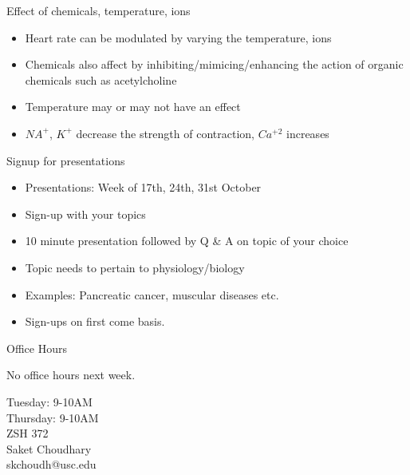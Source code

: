 \documentclass[10pt]{beamer}
\begin{document}
\begin{frame}[fragile]{Effect of chemicals, temperature, ions}
\begin{itemize}
\item Heart rate can be modulated by varying the temperature, ions
\item Chemicals also affect by inhibiting/mimicing/enhancing the action of organic chemicals such as acetylcholine
\item Temperature may or may not have an effect
\item $NA^+$, $K^+$ decrease the strength of contraction, $Ca^{+2}$ increases
\end{itemize}
\end{frame}

\begin{frame}[fragile]{Signup for presentations}
\begin{itemize}
\item Presentations: Week of 17th, 24th, 31st October
\item Sign-up with your topics
\item 10 minute presentation followed by Q \& A on topic of your choice
\item Topic needs to pertain to physiology/biology
\item Examples: Pancreatic cancer, muscular diseases etc.
\item Sign-ups on first come basis.
\end{itemize}
\end{frame}

\begin{frame}[fragile]{Office Hours}
\begin{center}
No office hours next week.
\end{center}

\Large \begin{center}Tuesday: 9-10AM\\
Thursday: 9-10AM\\
ZSH 372\\
\vspace*{2cm}
Saket Choudhary\\ 
skchoudh@usc.edu\\
\end{center}


\end{frame}
\end{document}
